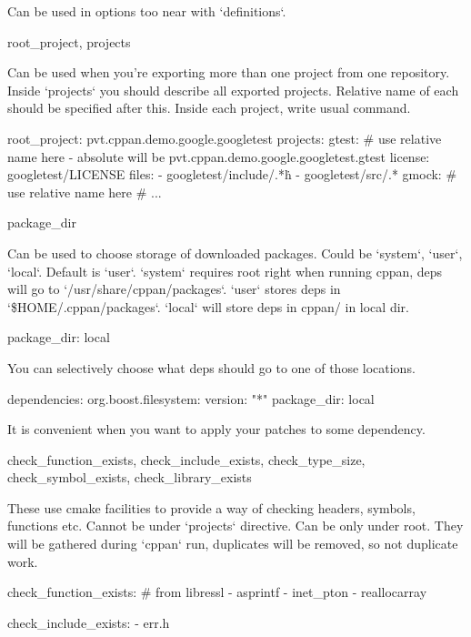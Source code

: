 Can be used in options too near with `definitions`.

root_project, projects

Can be used when you're exporting more than one project from one repository. Inside `projects` you should describe all exported projects. Relative name of each should be specified after this. Inside each project, write usual command.

\begin{cppan}
    root_project: pvt.cppan.demo.google.googletest
      projects:
        gtest: # use relative name here - absolute will be pvt.cppan.demo.google.googletest.gtest
          license: googletest/LICENSE
          files:
            - googletest/include/.*\.h
            - googletest/src/.*
        gmock: # use relative name here
          # ...
\end{cppan}

package_dir

Can be used to choose storage of downloaded packages. Could be `system`, `user`, `local`. Default is `user`. `system` requires root right when running cppan, deps will go to `/usr/share/cppan/packages`. `user` stores deps in `\$HOME/.cppan/packages`. `local` will store deps in cppan/ in local dir.

    package_dir: local

You can selectively choose what deps should go to one of those locations.

\begin{cppan}
    dependencies:
        org.boost.filesystem:
            version: "*"
            package_dir: local
\end{cppan}

It is convenient when you want to apply your patches to some dependency.

check_function_exists, check_include_exists, check_type_size, check_symbol_exists, check_library_exists

These use cmake facilities to provide a way of checking headers, symbols, functions etc. Cannot be under `projects` directive. Can be only under root. They will be gathered during `cppan` run, duplicates will be removed, so not duplicate work.

\begin{cppan}
    check_function_exists: # from libressl
      - asprintf
      - inet_pton
      - reallocarray

    check_include_exists:
      - err.h
\end{cppan}



